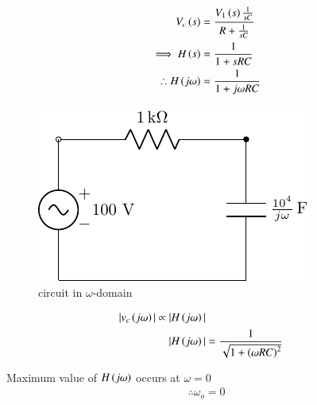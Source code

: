 \documentclass[journal,12pt,twocolumn]{IEEEtran}
\theoremstyle{remark}
\begin{document}
\begin{align}
V_c\left(s\right)&= \frac{V_1\left(s\right)\frac{1}{sC}}{R+\frac{1}{sC}}\\
\implies H\left(s\right) &= \frac{1}{1+ sRC}\\
\therefore H\left(j\omega\right) &= \frac{1}{1+j\omega RC} 
\end{align}
\begin{figure}[h!]
    \includegraphics[width = \columnwidth]{figs/c_fig2.pdf}
    \caption{circuit in $ \omega$-domain }
    \centering
    \label{fig: bm_16_fig_2}
\end{figure}

\begin{align}
|v_c\left(j\omega\right)| \propto |H\left(j\omega\right)|\\
|H\left(j\omega\right)| &= \frac{1}{\sqrt{1+\left(\omega RC\right)^2}} 
\end{align}

Maximum value of $ H\left(j\omega\right)$ occurs at $ \omega=0$
\begin{align}
\therefore \omega_o =0
\end{align}
\end{document}
